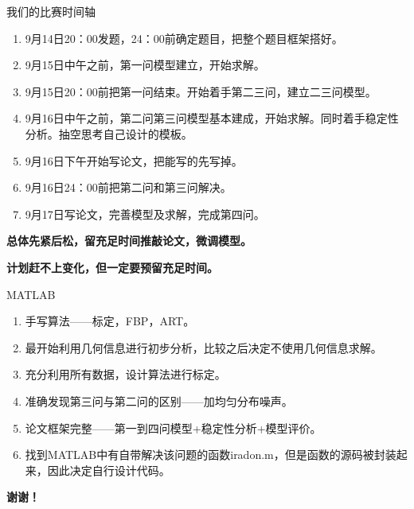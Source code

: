 \documentclass{beamer} %
\begin{document}
  \begin{frame}{我们的比赛时间轴}
	\begin{enumerate}
	  \item \small 9月14日20：00发题，24：00前确定题目，把整个题目框架搭好。
	  \item \small 9月15日中午之前，第一问模型建立，开始求解。
	  \item \small 9月15日20：00前把第一问结束。开始着手第二三问，建立二三问模型。
	  \item \small 9月16日中午之前，第二问第三问模型基本建成，开始求解。同时着手稳定性分析。抽空思考自己设计的模板。
	  \item \small 9月16日下午开始写论文，把能写的先写掉。
	  \item \small 9月16日24：00前把第二问和第三问解决。
	  \item \small 9月17日写论文，完善模型及求解，完成第四问。
	\end{enumerate}
	\begin{center}
	  \textbf{总体先紧后松，留充足时间推敲论文，微调模型。}
	  
	  \textbf{计划赶不上变化，但一定要预留充足时间。}
	\end{center}
  \end{frame}
  \begin{frame}{MATLAB}
  	\begin{enumerate}
	  \item \small 手写算法——标定，FBP，ART。
	  \item \small 最开始利用几何信息进行初步分析，比较之后决定不使用几何信息求解。
	  \item \small 充分利用所有数据，设计算法进行标定。
	  \item \small 准确发现第三问与第二问的区别——加均匀分布噪声。
	  \item \small 论文框架完整——第一到四问模型+稳定性分析+模型评价。
	  \item \small 找到MATLAB中有自带解决该问题的函数iradon.m，但是函数的源码被封装起来，因此决定自行设计代码。
	\end{enumerate}
	
	\end{frame}


	\begin{frame}
		\begin{center}
			\Huge{\bf{谢谢！}}
		\end{center}
	\end{frame}
\end{document}
